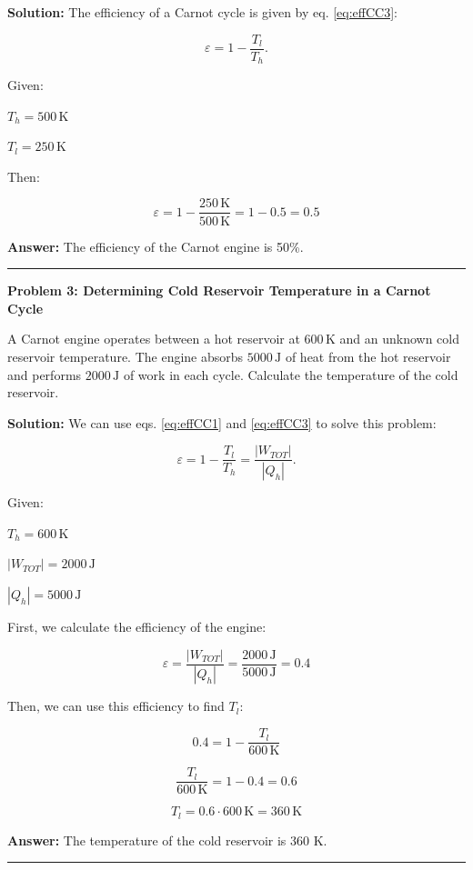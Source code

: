 \documentclass[
  9pt,
]{extbook}
\theoremstyle{definition}
\theoremstyle{definition}
\theoremstyle{definition}
\theoremstyle{remark}
\begin{document}
\textbf{Solution:} The efficiency of a Carnot cycle is given by eq. \eqref{eq:effCC3}:

\[\varepsilon = 1 - \frac{T_l}{T_h}.\]

Given:

\(T_h = 500\,\text{K}\)

\(T_l = 250\,\text{K}\)

Then:

\[\varepsilon = 1 - \frac{250\,\text{K}}{500\,\text{K}} = 1 - 0.5 = 0.5\]

\textbf{Answer:} The efficiency of the Carnot engine is 50\%.

\begin{center}\rule{0.5\linewidth}{0.5pt}\end{center}

\textbf{Problem 3: Determining Cold Reservoir Temperature in a Carnot Cycle}

A Carnot engine operates between a hot reservoir at \(600 \,\text{K}\) and an unknown cold reservoir temperature. The engine absorbs \(5000\,\text{J}\) of heat from the hot reservoir and performs \(2000\,\text{J}\) of work in each cycle. Calculate the temperature of the cold reservoir.

\textbf{Solution:} We can use eqs. \eqref{eq:effCC1} and \eqref{eq:effCC3} to solve this problem:

\[\varepsilon = 1 - \frac{T_l}{T_h} = \frac{|W_{TOT}|}{|Q_h|}.\]

Given:

\(T_h = 600\,\text{K}\)

\(|W_{TOT}| = 2000\,\text{J}\)

\(|Q_h| = 5000\,\text{J}\)

First, we calculate the efficiency of the engine:

\[\varepsilon = \frac{|W_{TOT}|}{|Q_h|} = \frac{2000\,\text{J}}{5000 \,\text{J}} = 0.4\]

Then, we can use this efficiency to find \(T_l\):

\[0.4 = 1 - \frac{T_l}{600\,\text{K}}\]

\[\frac{T_l}{600\,\text{K}} = 1 - 0.4 = 0.6\]

\[T_l = 0.6 \cdot 600\,\text{K} = 360 \,\text{K}\]

\textbf{Answer:} The temperature of the cold reservoir is 360 K.

\begin{center}\rule{0.5\linewidth}{0.5pt}\end{center}
\end{document}
